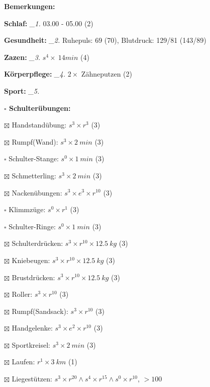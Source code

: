 \documentclass[10pt,a4paper]{article}
\newcommand\prop[1] {{\color {alizarin} {\bf #1}}}             %
\newcommand\mand[1] {{\color {burntorange} {\bf #1}}}          %
\newcommand\topspace{\vskip -15pt \hskip 20pt}
\newcommand\n[1] { {\sl #1.} \hskip 5pt }
\begin{document}
\begin{mdframed}[style=daystyle]
  \begin{labeling}{{\mand {Bemerkungen:}}}
    \setlength\itemsep{-3pt}
  \item[{\mand {Schlaf:}}]        \n{\_1} 03.00 - 05.00 (2)
  \item[{\mand {Gesundheit:}}]    \n{\_2} Ruhepuls: 69 (70), Blutdruck: 129/81 (143/89)
  \item[{\mand {Zazen:}}]         \n{\_3} $s^4 \times\ 14 min$ (4)
  \item[{\mand {Körperpflege:}}]  \n{\_4} $2 \times$ Zähneputzen (2)
   \item[{\mand {Sport:}}]        \n{\_5}
    \topspace
    \begin{minipage}{0.75\textwidth}  
      \begin{labeling}{\prop {$\square$ {Schulterübungen:}}} 
        \setlength\itemsep{-3pt}
      \item[$\boxtimes$ Handstandübung:]  $s^3 \times r^{3}$ (3)
      \item[$\boxtimes$ Rumpf(Wand):]     $s^3 \times 2\ min$ (3)
      \item[$\square$ Schulter-Stange:] $s^0 \times 1\ min$ (3)
      \item[$\boxtimes$ Schmetterling:]   $s^3 \times 2\ min$ (3)
      \item[$\boxtimes$ Nackenübungen:]   $s^3 \times e^3 \times r^{10}$ (3)
      \item[$\square$ Klimmzüge:]       $s^0 \times r^1$ (3)
      \item[$\square$ Schulter-Ringe:]  $s^0 \times 1\ min$ (3)
      \item[$\boxtimes$ Schulterdrücken:] $s^3 \times r^{10} \times 12.5\ kg$ (3)
      \item[$\boxtimes$ Kniebeugen:]      $s^3 \times r^{10} \times 12.5\ kg$ (3)
      \item[$\boxtimes$ Brustdrücken:]    $s^3 \times r^{10} \times 12.5\ kg$ (3)
      \item[$\boxtimes$ Roller:]          $s^3 \times r^{10}$ (3)
      \item[$\boxtimes$ Rumpf(Sandsack):] $s^3 \times r^{10}$ (3)
      \item[$\boxtimes$ Handgelenke:]     $s^3 \times e^2 \times r^{10}$ (3)
      \item[$\boxtimes$ Sportkreisel:]    $s^3 \times 2\ min$ (3)
      \item[$\boxtimes$ Laufen:]          $r^1 \times 3\ km$ (1)
      \item[$\boxtimes$ Liegestützen:]    $s^3 \times r^{20} \land s^4 \times r^{15} \land s^0 \times r^{10}$, $> 100$

\end{labeling}
\end{minipage}
\end{labeling}
\end{mdframed}
\end{document}
